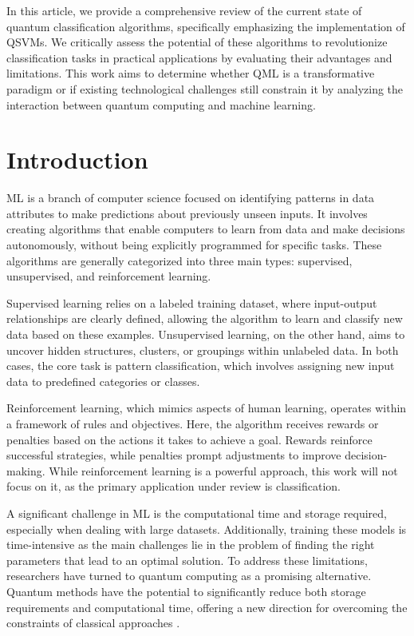 \documentclass{article}
\begin{document}
In this article, we provide a comprehensive review of the current state of quantum classification algorithms, specifically emphasizing the implementation of QSVMs. We critically assess the potential of these algorithms to revolutionize classification tasks in practical applications by evaluating their advantages and limitations. This work aims to determine whether QML is a transformative paradigm or if existing technological challenges still constrain it by analyzing the interaction between quantum computing and machine learning.

\section*{Introduction}
ML is a branch of computer science focused on identifying patterns in data attributes to make predictions about previously unseen inputs. It involves creating algorithms that enable computers to learn from data and make decisions autonomously, without being explicitly programmed for specific tasks. These algorithms are generally categorized into three main types: supervised, unsupervised, and reinforcement learning.

Supervised learning relies on a labeled training dataset, where input-output relationships are clearly defined, allowing the algorithm to learn and classify new data based on these examples. Unsupervised learning, on the other hand, aims to uncover hidden structures, clusters, or groupings within unlabeled data. In both cases, the core task is pattern classification, which involves assigning new input data to predefined categories or classes.

Reinforcement learning, which mimics aspects of human learning, operates within a framework of rules and objectives. Here, the algorithm receives rewards or penalties based on the actions it takes to achieve a goal. Rewards reinforce successful strategies, while penalties prompt adjustments to improve decision-making. While reinforcement learning is a powerful approach, this work will not focus on it, as the primary application under review is classification.

A significant challenge in ML is the computational time and storage required, especially when dealing with large datasets. Additionally, training these models is time-intensive as the main challenges lie in the problem of finding the right parameters that lead to an optimal solution. To address these limitations, researchers have turned to quantum computing as a promising alternative. Quantum methods have the potential to significantly reduce both storage requirements and computational time, offering a new direction for overcoming the constraints of classical approaches \cite{degruyterIntroductionQuantum}.
\end{document}
